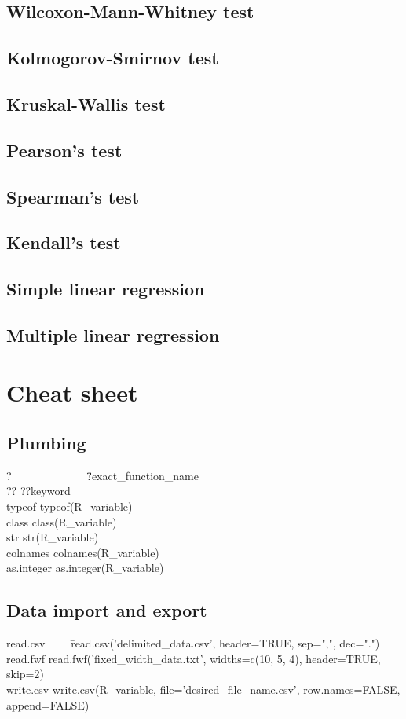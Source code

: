 \documentclass{report}
\begin{document}
	\section{Wilcoxon-Mann-Whitney test}
	\section{Kolmogorov-Smirnov test}
	\section{Kruskal-Wallis test}
	\section{Pearson’s test}
	\section{Spearman’s test}
	\section{Kendall’s test}
	\section{Simple linear regression}
	\section{Multiple linear regression}

\chapter{Cheat sheet}

	\section{Plumbing}
\begin{tabbing}
?~~~~~~~~~~~~~ \= ?exact\_function\_name \\
?? \> ??keyword \\
typeof \> typeof(R\_variable) \\
class \> class(R\_variable) \\
str \> str(R\_variable) \\
colnames \> colnames(R\_variable) \\
as.integer \> as.integer(R\_variable)
\end{tabbing}

	\section{Data import and export}
\begin{tabbing}
read.csv~~~~ \= read.csv('delimited\_data.csv', header=TRUE, sep=",", dec=".") \\
read.fwf \> read.fwf('fixed\_width\_data.txt', widths=c(10, 5, 4), header=TRUE, skip=2) \\
write.csv \> write.csv(R\_variable, file='desired\_file\_name.csv', row.names=FALSE, append=FALSE)
\end{tabbing}

\printbibliography

\printnoidxglossaries
\end{document}
